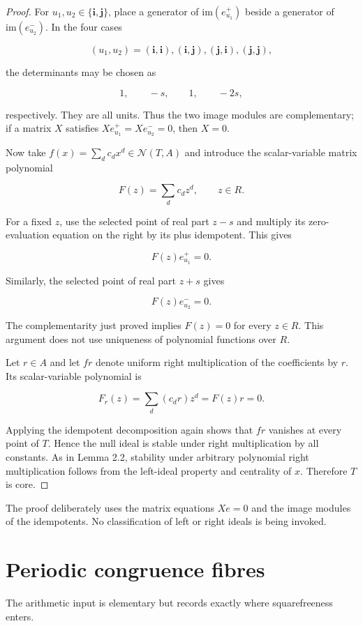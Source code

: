 \documentclass[11pt]{article}
\theoremstyle{remark}
\numberwithin{equation}{section}
\begin{document}
\begin{proof}
For $u_1,u_2\in\{\mathbf i,\mathbf j\}$, place a generator of
$\mathrm{im}(e_{u_1}^+)$ beside a generator of
$\mathrm{im}(e_{u_2}^-)$. In the four cases

\[
(u_1,u_2)
=(\mathbf i,\mathbf i),(\mathbf i,\mathbf j),
(\mathbf j,\mathbf i),(\mathbf j,\mathbf j),
\]

the determinants may be chosen as

\[
1,\qquad -s,\qquad1,\qquad-2s,
\]

respectively. They are all units. Thus the two image modules are
complementary; if a matrix $X$ satisfies
$Xe_{u_1}^+=Xe_{u_2}^-=0$, then $X=0$.

Now take
$f(x)=\sum_dc_dx^d\in\mathcal N(T,A)$ and introduce the scalar-variable
matrix polynomial

\[
F(z)=\sum_dc_dz^d,
\qquad z\in R.
\]

For a fixed $z$, use the selected point of real part $z-s$ and multiply its
zero-evaluation equation on the right by its plus idempotent. This gives

\[
F(z)e_{u_1}^+=0.
\]

Similarly, the selected point of real part $z+s$ gives

\[
F(z)e_{u_2}^-=0.
\]

The complementarity just proved implies $F(z)=0$ for every $z\in R$. This
argument does not use uniqueness of polynomial functions over $R$.

Let $r\in A$ and let $fr$ denote uniform right multiplication of the
coefficients by $r$. Its scalar-variable polynomial is

\[
F_r(z)=\sum_d(c_dr)z^d=F(z)r=0.
\]

Applying the idempotent decomposition again shows that $fr$ vanishes at every
point of $T$. Hence the null ideal is stable under right multiplication by
all constants. As in Lemma 2.2, stability under arbitrary polynomial right
multiplication follows from the left-ideal property and centrality of $x$.
Therefore $T$ is core.
\end{proof}

The proof deliberately uses the matrix equations $Xe=0$ and the image modules
of the idempotents. No classification of left or right ideals is being
invoked.

\section{Periodic congruence fibres}

The arithmetic input is elementary but records exactly where squarefreeness
enters.
\end{document}
